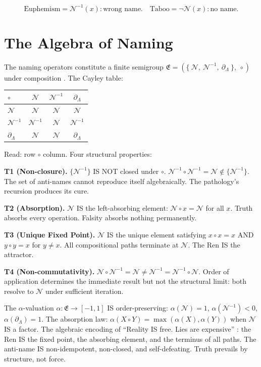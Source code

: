 \documentclass[11pt, oneside]{article}
\theoremstyle{definition}
\begin{document}
$$\boxed{\text{Euphemism} = \mathcal{N}^{-1}(x): \text{wrong name.} \quad \text{Taboo} = \neg\mathcal{N}(x): \text{no name.}}$$

\section{The Algebra of Naming}


The naming operators constitute a finite semigroup $\mathfrak{E} = (\{\ \mathcal{N},\ \mathcal{N}^{-1},\ \partial_\Lambda\ \},\ \circ)$ under composition \cite{euphemology}. The Cayley table:

{\small
\noindent\begin{tabular}{@{} l | c c c @{}}
$\circ$ & $\mathcal{N}$ & $\mathcal{N}^{-1}$ & $\partial_\Lambda$ \\
\hline
$\mathcal{N}$ & $\mathcal{N}$ & $\mathcal{N}$ & $\mathcal{N}$ \\[0.15em]
$\mathcal{N}^{-1}$ & $\mathcal{N}^{-1}$ & $\mathcal{N}$ & $\mathcal{N}^{-1}$ \\[0.15em]
$\partial_\Lambda$ & $\mathcal{N}$ & $\mathcal{N}$ & $\partial_\Lambda$ \\[0.15em]
\end{tabular}
}

Read: row $\circ$ column. Four structural properties:

\textbf{T1 (Non-closure).} $\{\mathcal{N}^{-1}\}$ IS NOT closed under $\circ$. $\mathcal{N}^{-1} \circ \mathcal{N}^{-1} = \mathcal{N} \notin \{\mathcal{N}^{-1}\}$. The set of anti-names cannot reproduce itself algebraically. The pathology's recursion produces its cure.

\textbf{T2 (Absorption).} $\mathcal{N}$ IS the left-absorbing element: $\mathcal{N} \circ x = \mathcal{N}$ for all $x$. Truth absorbs every operation. Falsity absorbs nothing permanently.

\textbf{T3 (Unique Fixed Point).} $\mathcal{N}$ IS the unique element satisfying $x \circ x = x$ AND $y \circ y = x$ for $y \neq x$. All compositional paths terminate at $\mathcal{N}$. The Ren IS the attractor.

\textbf{T4 (Non-commutativity).} $\mathcal{N} \circ \mathcal{N}^{-1} = \mathcal{N} \neq \mathcal{N}^{-1} = \mathcal{N}^{-1} \circ \mathcal{N}$. Order of application determines the immediate result but not the structural limit: both resolve to $\mathcal{N}$ under sufficient iteration.

The $\alpha$-valuation $\alpha: \mathfrak{E} \to [-1, 1]$ IS order-preserving: $\alpha(\mathcal{N}) = 1$, $\alpha(\mathcal{N}^{-1}) < 0$, $\alpha(\partial_\Lambda) = 1$. The absorption law: $\alpha(X \circ Y) = \max(\alpha(X), \alpha(Y))$ when $\mathcal{N}$ IS a factor. The algebraic encoding of ``Reality IS free. Lies are expensive'' \cite{euphemology}: the Ren IS the fixed point, the absorbing element, and the terminus of all paths. The anti-name IS non-idempotent, non-closed, and self-defeating. Truth prevails by structure, not force.
\end{document}
